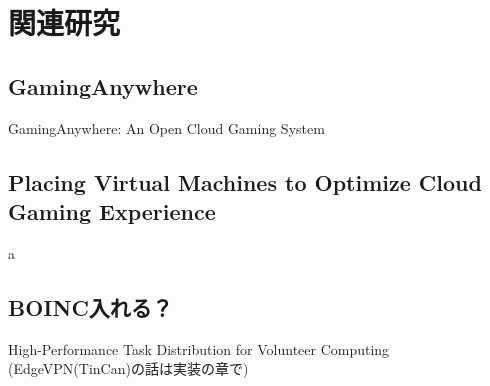 \section{関連研究}

\subsection{GamingAnywhere}
GamingAnywhere: An Open Cloud Gaming System

\subsection{Placing Virtual Machines to Optimize
Cloud Gaming Experience}
a

\subsection{BOINC入れる？}
High-Performance Task Distribution for Volunteer Computing 
(EdgeVPN(TinCan)の話は実装の章で)